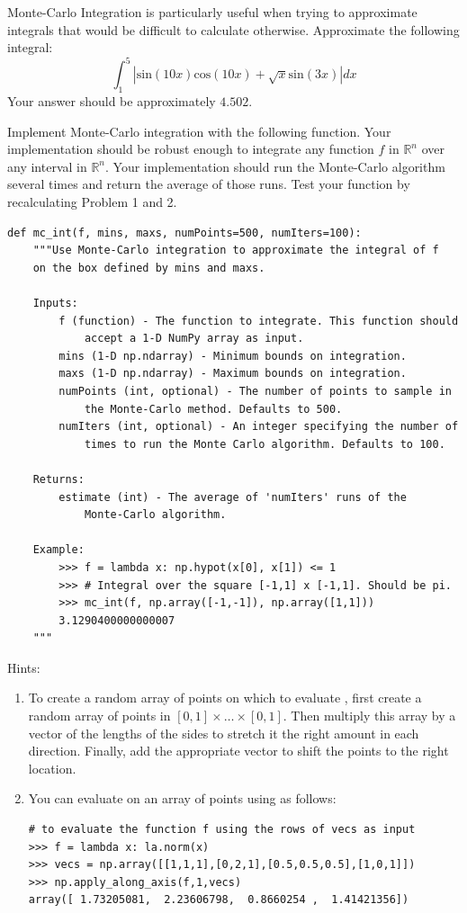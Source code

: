 \begin{problem}
Monte-Carlo Integration is particularly useful when trying to approximate integrals that would be difficult to calculate otherwise. Approximate the following integral:
$$\int_{1}^{5} \left | \text{sin}(10x)\text{cos}(10x) + \sqrt{x}\text{sin}(3x) \right | dx$$
Your answer should be approximately $4.502$.
\end{problem}

\begin{problem}
\label{prob:mc}
Implement Monte-Carlo integration with the following function. Your implementation should be robust enough to integrate any function $f$ in $\mathbb{R}^n$ over any interval in $\mathbb{R}^n$.
Your implementation should run the Monte-Carlo algorithm several times
and return the average of those runs. Test your function by recalculating Problem 1 and 2.
\begin{lstlisting}
def mc_int(f, mins, maxs, numPoints=500, numIters=100):
    """Use Monte-Carlo integration to approximate the integral of f
    on the box defined by mins and maxs.

    Inputs:
        f (function) - The function to integrate. This function should
            accept a 1-D NumPy array as input.
        mins (1-D np.ndarray) - Minimum bounds on integration.
        maxs (1-D np.ndarray) - Maximum bounds on integration.
        numPoints (int, optional) - The number of points to sample in
            the Monte-Carlo method. Defaults to 500.
        numIters (int, optional) - An integer specifying the number of
            times to run the Monte Carlo algorithm. Defaults to 100.

    Returns:
        estimate (int) - The average of 'numIters' runs of the
            Monte-Carlo algorithm.

    Example:
        >>> f = lambda x: np.hypot(x[0], x[1]) <= 1
        >>> # Integral over the square [-1,1] x [-1,1]. Should be pi.
        >>> mc_int(f, np.array([-1,-1]), np.array([1,1]))
        3.1290400000000007
    """
\end{lstlisting}

Hints:
\begin{enumerate}
\item To create a random array of points on which to evaluate , first create a random array of points in $[0,1] \times \ldots \times [0,1]$.
Then multiply this array by a vector of the lengths of the sides to stretch it the right amount in each direction.
Finally, add the appropriate vector to shift the points to the right location.
\item You can evaluate  on an array of points using  as follows:
\begin{lstlisting}
# to evaluate the function f using the rows of vecs as input
>>> f = lambda x: la.norm(x)
>>> vecs = np.array([[1,1,1],[0,2,1],[0.5,0.5,0.5],[1,0,1]])
>>> np.apply_along_axis(f,1,vecs)
array([ 1.73205081,  2.23606798,  0.8660254 ,  1.41421356])
\end{lstlisting}

\end{enumerate}
\end{problem}

